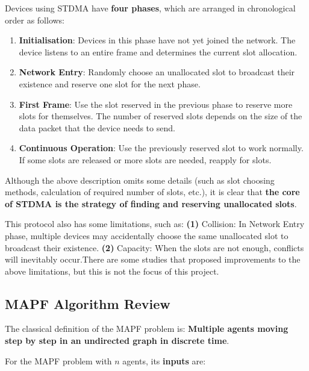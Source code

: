 \documentclass[12pt, oneside]{article}
\begin{document}
Devices using STDMA have \textbf{four phases}, which are arranged in chronological order as follows:

\begin{enumerate}
    \item \textbf{Initialisation}: Devices in this phase have not yet joined the network. The device listens to an entire frame and determines the current slot allocation.
    \item \textbf{Network Entry}:  Randomly choose an unallocated slot to broadcast their existence and reserve one slot for the next phase.
    \item \textbf{First Frame}: Use the slot reserved in the previous phase to reserve more slots for themselves. The number of reserved slots depends on the size of the data packet that the device needs to send.
    \item \textbf{Continuous Operation}: Use the previously reserved slot to work normally. If some slots are released or more slots are needed, reapply for slots.
\end{enumerate}

Although the above description omits some details (such as slot choosing methods, calculation of required number of slots, etc.), it is clear that \textbf{the core of STDMA is the strategy of finding and reserving unallocated slots}.

This protocol also has some limitations, such as: \textbf{(1)} Collision: In Network Entry phase, multiple devices may accidentally choose the same unallocated slot to broadcast their existence. \textbf{(2)} Capacity: When the slots are not enough, conflicts will inevitably occur.There are some studies \cite{STDMA_improv1,STDMA_improv2} that proposed improvements to the above limitations, but this is not the focus of this project.


\subsection{MAPF Algorithm Review}
\label{MAPF_Review}

The classical definition of the MAPF problem is: \textbf{Multiple agents moving step by step in an undirected graph in discrete time}\cite{MAPF_Deadlock_Explain1}.

\vspace{0.4cm}

For the MAPF problem with $n$ agents, its \textbf{inputs} are:
\end{document}
